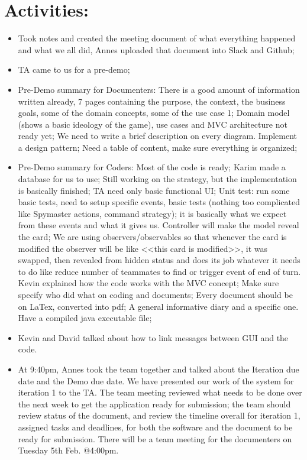 \documentclass[12pt]{article}
\begin{document}
\section{Activities:} 
\begin{itemize}
\item Took notes and created the meeting document of what everything happened and what we all did, Annes uploaded that document into Slack and Github;
\item TA came to us for a pre-demo;
\item Pre-Demo summary for Documenters: There is a good amount of information written already, 7 pages containing the purpose, the context, the business goals, some of the domain concepts, some of the use case 1; Domain model (shows a basic ideology of the game), use cases and MVC architecture not ready yet; We need to write a brief description on every diagram. Implement a design pattern; Need a table of content, make sure everything is organized;
\item Pre-Demo summary for Coders: Most of the code is ready; Karim made a database for us to use; Still working on the strategy, but the implementation is basically finished; TA need only basic functional UI; Unit test: run some basic tests, need to setup specific events, basic tests (nothing too complicated like Spymaster actions, command strategy); it is basically what we expect from these events and what it gives us. Controller will make the model reveal the card;  We are using observers/observables so that whenever the card is modified the observer will be like <<this card is modified>>, it was swapped, then revealed from hidden status and does its job whatever it needs to do like reduce number of teammates to find or trigger event of end of turn. Kevin explained how the code works with the MVC concept;  Make sure specify who did what on coding and documents; Every document should be on LaTex, converted into pdf; A general informative diary and a specific one. Have a compiled java executable file;
\item Kevin and David talked about how to link messages between GUI and the code.
\clearpage
\item At 9:40pm, Annes took the team together and talked about the Iteration due date and the Demo due date. We have presented our work of the system for iteration 1 to the TA. The team meeting reviewed what needs to be done over the next week to get the application ready for submission; the team should review status of the document, and review the timeline overall for iteration 1, assigned tasks and deadlines, for both the software and the document to be ready for submission. There will be a team meeting for the documenters on Tuesday 5th Feb. @4:00pm.

\end{itemize}
\end{document}
